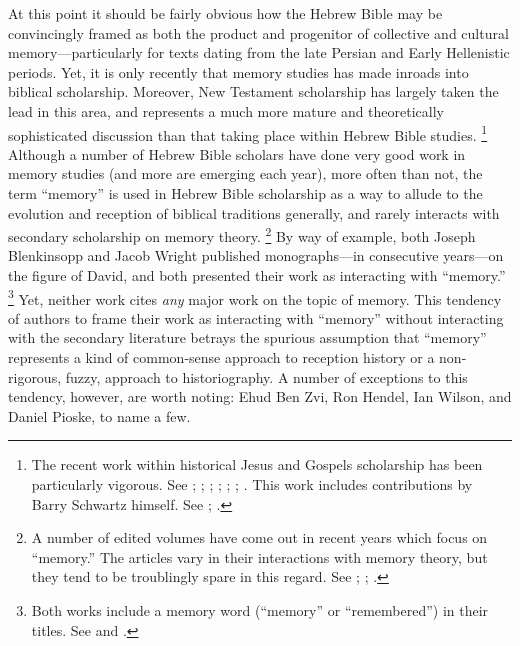At this point it should be fairly obvious how the Hebrew Bible may be convincingly framed as both the product and progenitor of collective and cultural memory---particularly for texts dating from the late Persian and Early Hellenistic periods. Yet, it is only recently that memory studies has made inroads into biblical scholarship. Moreover, New Testament scholarship has largely taken the lead in this area, and represents a much more mature and theoretically sophisticated discussion than that taking place within Hebrew Bible studies.%
    \footnote{%
        The recent work within historical Jesus and Gospels scholarship has been particularly vigorous. See 
            \cite{keith_ec2015};
            \cite{keith_ec2015b};
            \cite{thatcher2014};
            \cite{rodriguez2010};
            \cite{ledonne2009};
            \cite{hubenthal_carstens-hasselbalch2012};
            \cite{kirk-thatcher2005}. This work includes contributions by Barry Schwartz himself. See 
            \cite{schwartz_kirk-thatcher2005a};
            \cite{schwartz_kirk-thatcher2005b}.}
Although a number of Hebrew Bible scholars have done very good work in memory studies (and more are emerging each year), more often than not, the term ``memory'' is used in Hebrew Bible scholarship as a way to allude to the evolution and reception of biblical traditions generally, and rarely interacts with secondary scholarship on memory theory.%
    \footnote{%
        A number of edited volumes have come out in recent years which focus on ``memory.'' The articles vary in their interactions with memory theory, but they tend to be troublingly spare in this regard. See 
        \cite{edelman-benzvi2013};
        \cite{benzvi-levin2012};
        \cite{carstens-hasselbalch2012}.}
By way of example, both Joseph Blenkinsopp and Jacob Wright published monographs---in consecutive years---on the figure of David, and both presented their work as interacting with ``memory.''%
    \footnote{%
        Both works include a memory word (``memory'' or ``remembered'') in their titles. See \cite{blenkinsopp2013} and \cite{wright2014}.}
Yet, neither work cites \emph{any} major work on the topic of memory. This tendency of authors to frame their work as interacting with ``memory'' without interacting with the secondary literature betrays the spurious assumption that ``memory'' represents a kind of common-sense approach to reception history or a non-rigorous, fuzzy, approach to historiography. A number of exceptions to this tendency, however, are worth noting: Ehud Ben Zvi, Ron Hendel, Ian Wilson, and Daniel Pioske, to name a few.%
